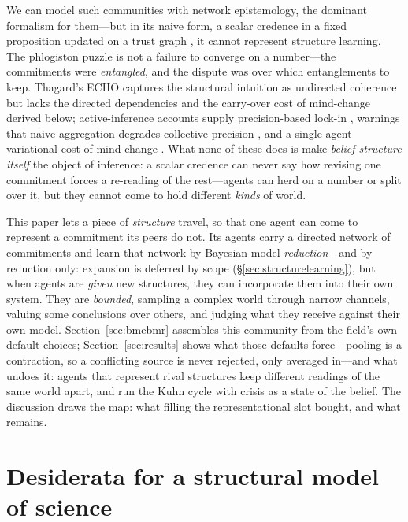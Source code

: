\documentclass[runningheads]{llncs}
\begin{document}
We can model such communities with network epistemology, the dominant formalism for them---but
in its naive form, a scalar credence in a fixed proposition updated on a trust graph
\citep{zollman2010,oconnor2019,zollman2013,jonard2025,michelini2023}, it cannot represent
structure learning. The phlogiston puzzle
is not a failure to converge on a number---the commitments were \emph{entangled}, and the
dispute was over which entanglements to keep. Thagard's ECHO \citep{thagard1989,thagard1990}
captures the structural intuition as undirected coherence but lacks the directed dependencies
and the carry-over cost of mind-change derived below; active-inference accounts supply precision-based
lock-in \citep{albarracin2022}, warnings that naive aggregation degrades collective precision
\citep{friston2023federated,waade2025}, and a single-agent variational cost of mind-change
\citep{hyland2025}. What none of these does is make \emph{belief structure itself} the object
of inference: a scalar credence can never say how revising one commitment forces a re-reading
of the rest---agents can herd on a number or split over it, but they cannot come to hold
different \emph{kinds} of world.

This paper lets a piece of \emph{structure} travel, so that one agent can come to represent a
commitment its peers do not. Its agents carry a directed network of commitments and learn that
network by Bayesian model \emph{reduction}---and by reduction only: expansion is deferred by
scope (\S\ref{sec:structurelearning}), but when agents are \emph{given} new structures, they
can incorporate them into their own system. They are \emph{bounded}, sampling a complex
world through narrow channels, valuing some conclusions over others, and judging what they
receive against their own model. Section~\ref{sec:bmebmr} assembles this community from the
field's own default choices; Section~\ref{sec:results} shows what those defaults force---pooling is a
contraction, so a conflicting source is never rejected, only averaged in---and what undoes it:
agents that represent rival structures keep different readings of the same world apart, and
run the Kuhn cycle with crisis as a state of the belief. The discussion
draws the map: what filling the representational slot bought, and what
remains.

\section{Desiderata for a structural model of science}
\label{sec:hidden}
\end{document}
